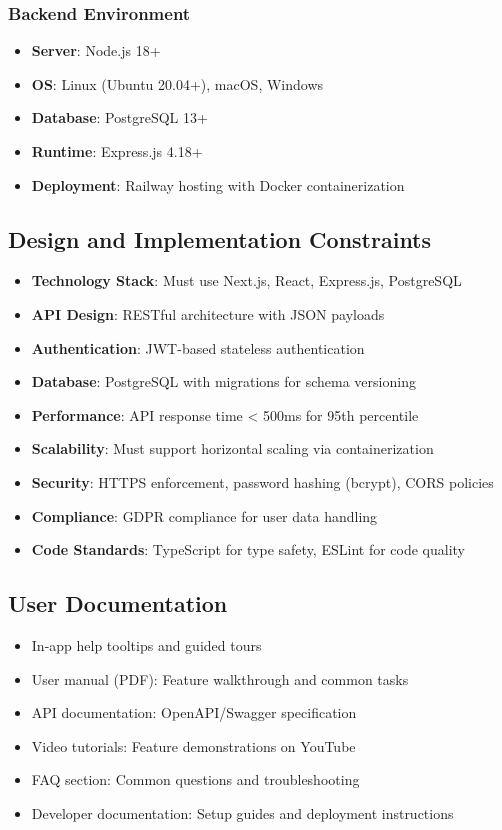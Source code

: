 \documentclass[12pt,a4paper]{article}
\begin{document}
\subsubsection{Backend Environment}
\begin{itemize}
    \item \textbf{Server}: Node.js 18+
    \item \textbf{OS}: Linux (Ubuntu 20.04+), macOS, Windows
    \item \textbf{Database}: PostgreSQL 13+
    \item \textbf{Runtime}: Express.js 4.18+
    \item \textbf{Deployment}: Railway hosting with Docker containerization
\end{itemize}

\subsection{Design and Implementation Constraints}
\begin{itemize}
    \item \textbf{Technology Stack}: Must use Next.js, React, Express.js, PostgreSQL
    \item \textbf{API Design}: RESTful architecture with JSON payloads
    \item \textbf{Authentication}: JWT-based stateless authentication
    \item \textbf{Database}: PostgreSQL with migrations for schema versioning
    \item \textbf{Performance}: API response time < 500ms for 95th percentile
    \item \textbf{Scalability}: Must support horizontal scaling via containerization
    \item \textbf{Security}: HTTPS enforcement, password hashing (bcrypt), CORS policies
    \item \textbf{Compliance}: GDPR compliance for user data handling
    \item \textbf{Code Standards}: TypeScript for type safety, ESLint for code quality
\end{itemize}

\subsection{User Documentation}
\begin{itemize}
    \item In-app help tooltips and guided tours
    \item User manual (PDF): Feature walkthrough and common tasks
    \item API documentation: OpenAPI/Swagger specification
    \item Video tutorials: Feature demonstrations on YouTube
    \item FAQ section: Common questions and troubleshooting
    \item Developer documentation: Setup guides and deployment instructions
\end{itemize}
\end{document}
